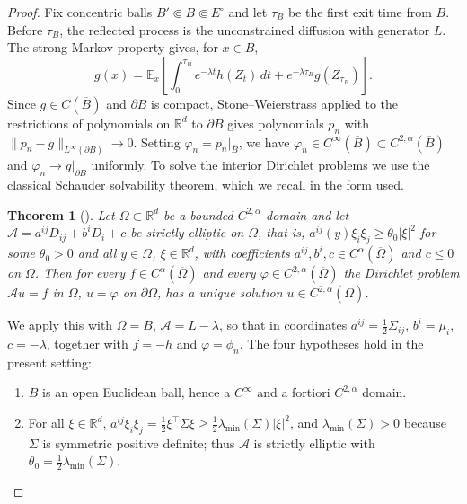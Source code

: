 \documentclass[aihp]{imsart}
\numberwithin{equation}{section}
\theoremstyle{plain}
\newtheorem{theorem}{Theorem}[section]
\theoremstyle{definition}
\newcommand{\R}{\mathbb R}
\newcommand{\1}{\mathbf 1}
\newcommand{\abs}[1]{\left\lvert #1\right\rvert}
\begin{document}
\begin{proof}
Fix concentric balls $B'\Subset B\Subset E^\circ$ and let $\tau_B$ be the first exit time from $B$. Before $\tau_B$, the reflected process is the unconstrained diffusion with generator $L$. The strong Markov property gives, for $x\in B$,
\begin{equation}\label{eq:stopped-resolvent}
 g(x)=\mathbb E_x\left[
 \int_0^{\tau_B}e^{-\lambda t}h(Z_t)\,dt
 +e^{-\lambda\tau_B}g(Z_{\tau_B})
 \right].
\end{equation}
Since \(g\in C(\overline B)\) and \(\partial B\) is compact, Stone--Weierstrass applied to the restrictions of polynomials on \(\mathbb R^d\) to \(\partial B\) gives polynomials \(p_n\) with \(\|p_n-g\|_{L^\infty(\partial B)}\to0\). Setting \(\varphi_n=p_n|_{\overline B}\), we have \(\varphi_n\in C^\infty(\overline B)\subset C^{2,\alpha}(\overline B)\) and \(\varphi_n\to g|_{\partial B}\) uniformly. To solve the interior Dirichlet problems we use the classical Schauder solvability theorem, which we recall in the form used.
\begin{theorem}[{\normalfont\cite[Theorem~6.14]{GilbargTrudinger2001}}]
Let $\Omega\subset\R^d$ be a bounded $C^{2,\alpha}$ domain and let $\mathcal A=a^{ij}D_{ij}+b^iD_i+c$ be strictly elliptic on $\Omega$, that is, $a^{ij}(y)\xi_i\xi_j\ge\theta_0\abs{\xi}^2$ for some $\theta_0>0$ and all $y\in\Omega$, $\xi\in\R^d$, with coefficients $a^{ij},b^i,c\in C^{\alpha}(\overline\Omega)$ and $c\le0$ on $\Omega$. Then for every $f\in C^{\alpha}(\overline\Omega)$ and every $\varphi\in C^{2,\alpha}(\overline\Omega)$ the Dirichlet problem $\mathcal Au=f$ in $\Omega$, $u=\varphi$ on $\partial\Omega$, has a unique solution $u\in C^{2,\alpha}(\overline\Omega)$.
\end{theorem}
We apply this with $\Omega=B$, $\mathcal A=L-\lambda$, so that in coordinates $a^{ij}=\tfrac12\Sigma_{ij}$, $b^i=\mu_i$, $c=-\lambda$, together with $f=-h$ and $\varphi=\phi_n$. The four hypotheses hold in the present setting:
\begin{enumerate}[label=\textup{(\alph*)}]
\item\label{it:gt-domain} $B$ is an open Euclidean ball, hence a $C^\infty$ and a fortiori $C^{2,\alpha}$ domain.
\item\label{it:gt-elliptic} For all $\xi\in\R^d$, $a^{ij}\xi_i\xi_j=\tfrac12\xi^\top\Sigma\xi\ge\tfrac12\lambda_{\min}(\Sigma)\abs{\xi}^2$, and $\lambda_{\min}(\Sigma)>0$ because $\Sigma$ is symmetric positive definite; thus $\mathcal A$ is strictly elliptic with $\theta_0=\tfrac12\lambda_{\min}(\Sigma)$.

\end{enumerate}
\end{proof}
\end{document}
